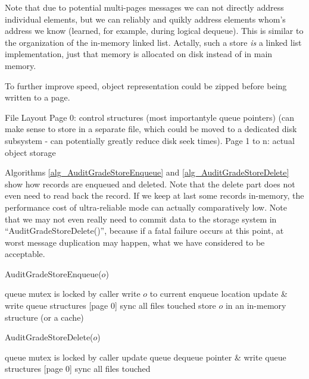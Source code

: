 \documentclass[a4paper,10pt]{article}
\begin{document}
Note that due to potential multi-pages messages we can not directly address individual elements, but we can reliably and quikly address elements whom's address we know (learned, for example, during logical dequeue). This is similar to the organization of the in-memory linked list. Actally, such a store \emph{is} a linked list implementation, just that memory is allocated on disk instead of in main memory.

To further improve speed, object representation could be zipped before being written to a page.

File Layout
Page 0: control structures (most importantyle queue pointers) (can make sense to store in a separate file, which could be moved to a dedicated disk subsystem - can potentially greatly reduce disk seek times).
Page 1 to n: actual object storage

Algorithms \ref{alg_AuditGradeStoreEnqueue} and \ref{alg_AuditGradeStoreDelete} show how records are enqueued and deleted. Note that the delete part does not even need to read back the record. If we keep at last some records in-memory, the performance cost of ultra-reliable mode can actually comparatively low. Note that we may not even really need to commit data to the storage system in ``AuditGradeStoreDelete()'', because if a fatal failure occurs at this point, at worst message duplication may happen, what we have considered to be acceptable.

\begin{algorithm}
\caption{AuditGradeStoreEnqueue($o$)}
\begin{algorithmic}
\label{alg_AuditGradeStoreEnqueue}
\REQUIRE queue mutex is locked by caller
\STATE write $o$ to current enqueue location
\STATE update \& write queue structures [page 0]
\STATE sync all files touched 
\STATE store $o$ in an in-memory structure (or a cache)
\end{algorithmic}
\end{algorithm}

\begin{algorithm}
\caption{AuditGradeStoreDelete($o$)}
\begin{algorithmic}
\label{alg_AuditGradeStoreDelete}
\REQUIRE queue mutex is locked by caller
\STATE update queue dequeue pointer \& write queue structures [page 0]
\STATE sync all files touched 
\end{algorithmic}
\end{algorithm}
\end{document}
